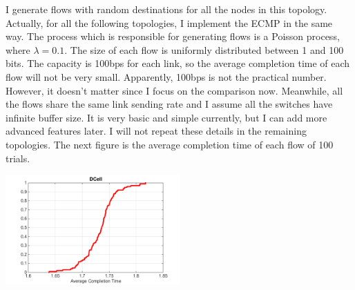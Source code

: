 \documentclass[11pt]{article}
\begin{document}
I generate flows with random destinations for all the nodes in this topology. Actually, for all the following topologies, I implement the ECMP in the same way. The process which is responsible for generating flows is a Poisson process, where $\lambda = 0.1$. The size of each flow is uniformly distributed between 1 and 100 bits. The capacity is 100bps for each link, so the average completion time of each flow will not be very small. Apparently, 100bps is not the practical number. However, it doesn't matter since I focus on the comparison now. Meanwhile, all the flows share the same link sending rate and I assume all the switches have infinite buffer size. It is very basic and simple currently, but I can add more advanced features later. I will not repeat these details in the remaining topologies. The next figure is the average completion time of each flow of 100 trials. \\
\centerline{\includegraphics[width=0.5\textwidth]{figure/picture/DCell.png}}
\end{document}
